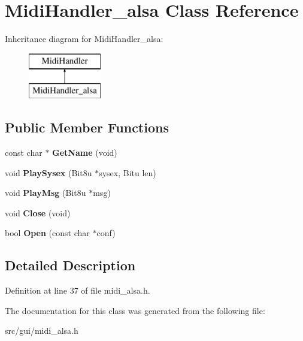 \hypertarget{classMidiHandler__alsa}{\section{Midi\-Handler\-\_\-alsa Class Reference}
\label{classMidiHandler__alsa}
}
Inheritance diagram for Midi\-Handler\-\_\-alsa\-:\begin{figure}[H]
\begin{center}
\leavevmode
\includegraphics[height=2.000000cm]{classMidiHandler__alsa}
\end{center}
\end{figure}
\subsection*{Public Member Functions}
\begin{DoxyCompactItemize}
\item 
\hypertarget{classMidiHandler__alsa_a68373fbabe94daae4ced68ef06dcdc66}{const char $\ast$ {\bfseries Get\-Name} (void)}\label{classMidiHandler__alsa_a68373fbabe94daae4ced68ef06dcdc66}

\item 
\hypertarget{classMidiHandler__alsa_a2e9fd1cabc9c2a83f9e7fadf6a836161}{void {\bfseries Play\-Sysex} (Bit8u $\ast$sysex, Bitu len)}\label{classMidiHandler__alsa_a2e9fd1cabc9c2a83f9e7fadf6a836161}

\item 
\hypertarget{classMidiHandler__alsa_a94872228154db675146cf881f5b8a1ee}{void {\bfseries Play\-Msg} (Bit8u $\ast$msg)}\label{classMidiHandler__alsa_a94872228154db675146cf881f5b8a1ee}

\item 
\hypertarget{classMidiHandler__alsa_a829657883e978481c44a8b2e6d3402a9}{void {\bfseries Close} (void)}\label{classMidiHandler__alsa_a829657883e978481c44a8b2e6d3402a9}

\item 
\hypertarget{classMidiHandler__alsa_a278d08cb4cecd3d5b874006261ce9aec}{bool {\bfseries Open} (const char $\ast$conf)}\label{classMidiHandler__alsa_a278d08cb4cecd3d5b874006261ce9aec}

\end{DoxyCompactItemize}


\subsection{Detailed Description}


Definition at line 37 of file midi\-\_\-alsa.\-h.



The documentation for this class was generated from the following file\-:\begin{DoxyCompactItemize}
\item 
src/gui/midi\-\_\-alsa.\-h\end{DoxyCompactItemize}
